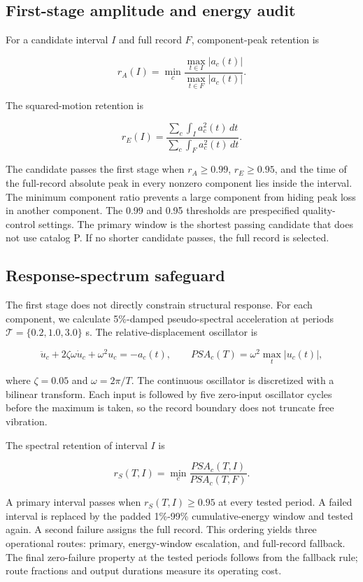 \documentclass[12pt,letterpaper]{article}
\begin{document}
\subsection{First-stage amplitude and energy audit}\label{first-stage-amplitude-and-energy-audit}

For a candidate interval \(I\) and full record \(F\), component-peak retention is

\[
r_A(I)=\min_c\frac{\max_{t\in I}|a_c(t)|}{\max_{t\in F}|a_c(t)|}.
\]

The squared-motion retention is

\[
r_E(I)=\frac{\sum_c\int_I a_c^2(t)\,dt}{\sum_c\int_F a_c^2(t)\,dt}.
\]

The candidate passes the first stage when \(r_A\geq0.99\), \(r_E\geq0.95\), and the time of the full-record absolute peak in every nonzero component lies inside the interval. The minimum component ratio prevents a large component from hiding peak loss in another component. The 0.99 and 0.95 thresholds are prespecified quality-control settings. The primary window is the shortest passing candidate that does not use catalog P. If no shorter candidate passes, the full record is selected.

\subsection{Response-spectrum safeguard}\label{response-spectrum-safeguard}

The first stage does not directly constrain structural response. For each component, we calculate 5\%-damped pseudo-spectral acceleration at periods \(\mathcal{T}=\{0.2,1.0,3.0\}\) s. The relative-displacement oscillator is

\[
\ddot u_c+2\zeta\omega\dot u_c+\omega^2u_c=-a_c(t),
\qquad PSA_c(T)=\omega^2\max_t|u_c(t)|,
\]

where \(\zeta=0.05\) and \(\omega=2\pi/T\). The continuous oscillator is discretized with a bilinear transform. Each input is followed by five zero-input oscillator cycles before the maximum is taken, so the record boundary does not truncate free vibration.

The spectral retention of interval \(I\) is

\[
r_S(T,I)=\min_c\frac{PSA_c(T,I)}{PSA_c(T,F)}.
\]

A primary interval passes when \(r_S(T,I)\geq0.95\) at every tested period. A failed interval is replaced by the padded 1\%-99\% cumulative-energy window and tested again. A second failure assigns the full record. This ordering yields three operational routes: primary, energy-window escalation, and full-record fallback. The final zero-failure property at the tested periods follows from the fallback rule; route fractions and output durations measure its operating cost.
\end{document}
